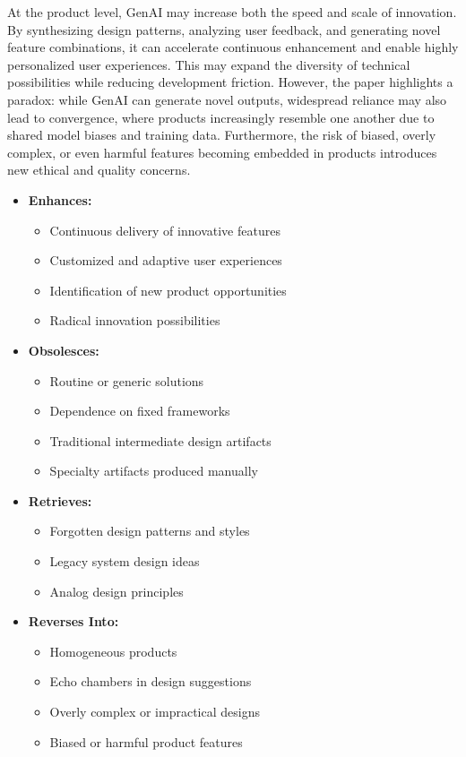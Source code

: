 At the product level, GenAI may increase both the speed and scale of innovation. By synthesizing design patterns, analyzing user feedback, and generating novel feature combinations, it can accelerate continuous enhancement and enable highly personalized user experiences. This may expand the diversity of technical possibilities while reducing development friction. However, the paper highlights a paradox: while GenAI can generate novel outputs, widespread reliance may also lead to convergence, where products increasingly resemble one another due to shared model biases and training data. Furthermore, the risk of biased, overly complex, or even harmful features becoming embedded in products introduces new ethical and quality concerns.
\begin{itemize}
    \item \textbf{Enhances:}
          \begin{itemize}
              \item Continuous delivery of innovative features
              \item Customized and adaptive user experiences
              \item Identification of new product opportunities
              \item Radical innovation possibilities
          \end{itemize}

    \item \textbf{Obsolesces:}
          \begin{itemize}
              \item Routine or generic solutions
              \item Dependence on fixed frameworks
              \item Traditional intermediate design artifacts
              \item Specialty artifacts produced manually
          \end{itemize}

    \item \textbf{Retrieves:}
          \begin{itemize}
              \item Forgotten design patterns and styles
              \item Legacy system design ideas
              \item Analog design principles
          \end{itemize}

    \item \textbf{Reverses Into:}
          \begin{itemize}
              \item Homogeneous products
              \item Echo chambers in design suggestions
              \item Overly complex or impractical designs
              \item Biased or harmful product features
          \end{itemize}
\end{itemize}

